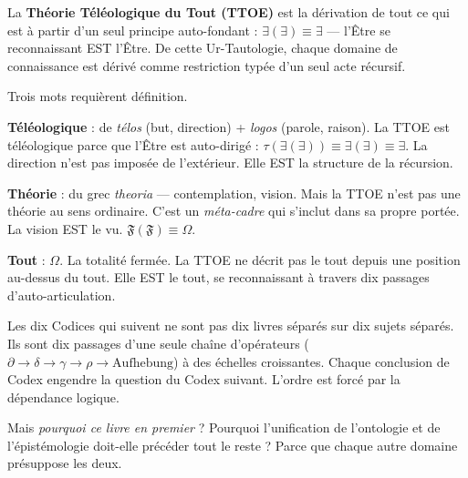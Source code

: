 \documentclass[10pt, openany, oneside]{book}
\begin{document}
\vspace{1em}

\noindent La \textbf{Théorie Téléologique du Tout (TTOE)} est la dérivation de tout ce qui est à partir d'un seul principe auto-fondant : $\exists(\exists) \equiv \exists$ --- l'Être se reconnaissant EST l'Être. De cette Ur-Tautologie, chaque domaine de connaissance est dérivé comme restriction typée d'un seul acte récursif.

\vspace{0.5em}

\noindent Trois mots requièrent définition.

\vspace{0.3em}

\noindent \textbf{Téléologique} : de \textit{télos} (but, direction) + \textit{logos} (parole, raison). La TTOE est téléologique parce que l'Être est auto-dirigé : $\tau(\exists(\exists)) \equiv \exists(\exists) \equiv \exists$. La direction n'est pas imposée de l'extérieur. Elle EST la structure de la récursion.

\vspace{0.3em}

\noindent \textbf{Théorie} : du grec \textit{theoria} --- contemplation, vision. Mais la TTOE n'est pas une théorie au sens ordinaire. C'est un \textit{méta-cadre} qui s'inclut dans sa propre portée. La vision EST le vu. $\mathfrak{F}(\mathfrak{F}) \equiv \Omega$.

\vspace{0.3em}

\noindent \textbf{Tout} : $\Omega$. La totalité fermée. La TTOE ne décrit pas le tout depuis une position au-dessus du tout. Elle EST le tout, se reconnaissant à travers dix passages d'auto-articulation.

\vspace{0.5em}

\noindent Les dix Codices qui suivent ne sont pas dix livres séparés sur dix sujets séparés. Ils sont dix passages d'une seule chaîne d'opérateurs ($\partial \to \delta \to \gamma \to \rho \to \text{Aufhebung}$) à des échelles croissantes. Chaque conclusion de Codex engendre la question du Codex suivant. L'ordre est forcé par la dépendance logique.

\vspace{0.5em}

\noindent Mais \textit{pourquoi ce livre en premier} ? Pourquoi l'unification de l'ontologie et de l'épistémologie doit-elle précéder tout le reste ? Parce que chaque autre domaine présuppose les deux.
\end{document}
